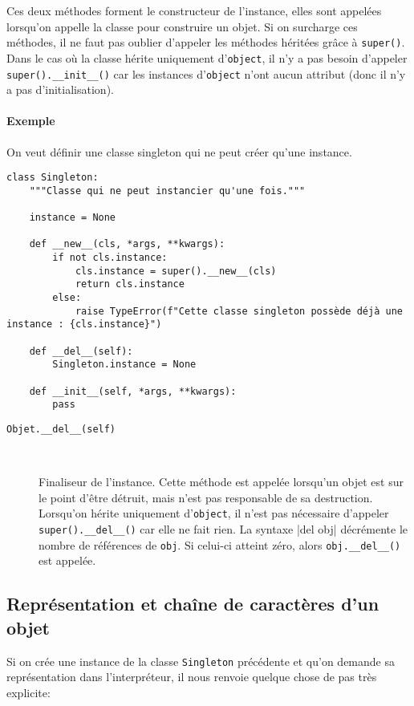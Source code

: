 Ces deux méthodes forment le constructeur\label{constructeur} de l'instance, elles sont appelées lorsqu'on appelle la classe pour construire un objet. Si on surcharge ces méthodes, il ne faut pas oublier d'appeler les méthodes héritées grâce à \texttt{super()}. Dans le cas où la classe hérite uniquement d'\texttt{object}, il n'y a pas besoin d'appeler \texttt{super().__init__()} car les instances d'\texttt{object} n'ont aucun attribut (donc il n'y a pas d'initialisation).

\paragraph{Exemple} On veut définir une classe \og singleton \fg{} qui ne peut créer qu'une instance.

\begin{verbatim}
class Singleton:
    """Classe qui ne peut instancier qu'une fois."""

    instance = None

    def __new__(cls, *args, **kwargs):
        if not cls.instance:
            cls.instance = super().__new__(cls)
            return cls.instance
        else:
            raise TypeError(f"Cette classe singleton possède déjà une instance : {cls.instance}")

    def __del__(self):
        Singleton.instance = None

    def __init__(self, *args, **kwargs):
        pass
\end{verbatim}

\begin{description}
    \item[\texttt{Objet.__del__(self)}]~

    Finaliseur de l'instance. Cette méthode est appelée lorsqu'un objet est sur le point d'être détruit, mais n'est pas responsable de sa destruction. Lorsqu'on hérite uniquement d'\texttt{object}, il n'est pas nécessaire d'appeler \texttt{super().__del__()} car elle ne fait rien. La syntaxe |del obj| décrémente le nombre de références de \texttt{obj}. Si celui-ci atteint zéro, alors \texttt{obj.__del__()} est appelée.
\end{description}

\subsection{Représentation et chaîne de caractères d'un objet}
Si on crée une instance de la classe \texttt{Singleton} précédente et qu'on demande sa représentation dans l'interpréteur, il nous renvoie quelque chose de pas très explicite:

